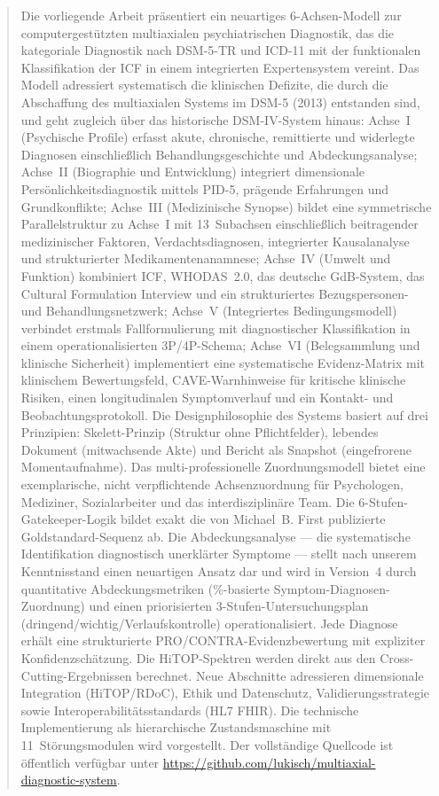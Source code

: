 \documentclass[11pt,a4paper]{article}
\begin{document}
\begin{abstract}
\noindent Die vorliegende Arbeit pr\"asentiert ein neuartiges 6-Achsen-Modell zur computergest\"utzten multiaxialen psychiatrischen Diagnostik, das die kategoriale Diagnostik nach DSM-5-TR und ICD-11 mit der funktionalen Klassifikation der ICF in einem integrierten Expertensystem vereint. Das Modell adressiert systematisch die klinischen Defizite, die durch die Abschaffung des multiaxialen Systems im DSM-5 (2013) entstanden sind, und geht zugleich \"uber das historische DSM-IV-System hinaus: Achse~I (Psychische Profile) erfasst akute, chronische, remittierte und widerlegte Diagnosen einschlie\ss{}lich Behandlungsgeschichte und Abdeckungsanalyse; Achse~II (Biographie und Entwicklung) integriert dimensionale Pers\"onlichkeitsdiagnostik mittels PID-5, pr\"agende Erfahrungen und Grundkonflikte; Achse~III (Medizinische Synopse) bildet eine symmetrische Parallelstruktur zu Achse~I mit 13~Subachsen einschlie\ss{}lich beitragender medizinischer Faktoren, Verdachtsdiagnosen, integrierter Kausalanalyse und strukturierter Medikamentenanamnese; Achse~IV (Umwelt und Funktion) kombiniert ICF, WHODAS~2.0, das deutsche GdB-System, das Cultural Formulation Interview und ein strukturiertes Bezugspersonen- und Behandlungsnetzwerk; Achse~V (Integriertes Bedingungsmodell) verbindet erstmals Fallformulierung mit diagnostischer Klassifikation in einem operationalisierten 3P/4P-Schema; Achse~VI (Belegsammlung und klinische Sicherheit) implementiert eine systematische Evidenz-Matrix mit klinischem Bewertungsfeld, CAVE-Warnhinweise f\"ur kritische klinische Risiken, einen longitudinalen Symptomverlauf und ein Kontakt- und Beobachtungsprotokoll. Die Designphilosophie des Systems basiert auf drei Prinzipien: Skelett-Prinzip (Struktur ohne Pflichtfelder), lebendes Dokument (mitwachsende Akte) und Bericht als Snapshot (eingefrorene Momentaufnahme). Das multi-professionelle Zuordnungsmodell bietet eine exemplarische, nicht verpflichtende Achsenzuordnung f\"ur Psychologen, Mediziner, Sozialarbeiter und das interdisziplin\"are Team. Die 6-Stufen-Gatekeeper-Logik bildet exakt die von Michael~B. First publizierte Goldstandard-Sequenz ab. Die Abdeckungsanalyse --- die systematische Identifikation diagnostisch unerkl\"arter Symptome --- stellt nach unserem Kenntnisstand einen neuartigen Ansatz dar und wird in Version~4 durch quantitative Abdeckungsmetriken (\%-basierte Symptom-Diagnosen-Zuordnung) und einen priorisierten 3-Stufen-Untersuchungsplan (dringend/wichtig/Verlaufskontrolle) operationalisiert. Jede Diagnose erh\"alt eine strukturierte PRO/CONTRA-Evidenzbewertung mit expliziter Konfidenzsch\"atzung. Die HiTOP-Spektren werden direkt aus den Cross-Cutting-Ergebnissen berechnet. Neue Abschnitte adressieren dimensionale Integration (HiTOP/RDoC), Ethik und Datenschutz, Validierungsstrategie sowie Interoperabilit\"atsstandards (HL7 FHIR). Die technische Implementierung als hierarchische Zustandsmaschine mit 11~St\"orungsmodulen wird vorgestellt. Der vollst\"andige Quellcode ist \"offentlich verf\"ugbar unter \url{https://github.com/lukisch/multiaxial-diagnostic-system}.


\end{abstract}
\end{document}
